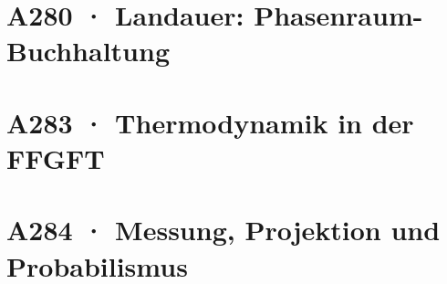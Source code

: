 \documentclass[11pt,twoside,openright]{book}
\begin{document}
\chapter[A280 · Phasenraum-Buchhaltung (erweitert)]{A280 · Landauer: Phasenraum-Buchhaltung}


\chapter[A283 · Thermodynamik in der FFGFT]{A283 · Thermodynamik in der FFGFT}


\chapter[A284 · Messung, Projektion, Probabilismus]{A284 · Messung, Projektion und Probabilismus}


\end{document}
